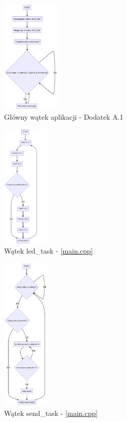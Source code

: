 \documentclass[12pt,oneside,a4paper]{book}
\theoremstyle{break}
\begin{document}
\begin{figure}[H]
    \begin{center}
        \includegraphics[width=0.25\textwidth]{uc-main_task}
        \caption{Główny wątek aplikacji - Dodatek A.1}
        \label{rys:uc-main_task}
    \end{center}
\end{figure}

\begin{figure}[H]
    \begin{center}
        \includegraphics[width=0.2\textwidth]{uc-led_task}
        \caption{Wątek led\_task - \ref*{main.cpp}}
        \label{rys:uc-led_task}
    \end{center}
\end{figure}

\begin{figure}[H]
    \begin{center}
        \includegraphics[width=0.2\textwidth]{uc-send_task}
        \caption{Wątek send\_task - \ref*{main.cpp}}
        \label{rys:uc-send_task}
    \end{center}
\end{figure}
\end{document}
